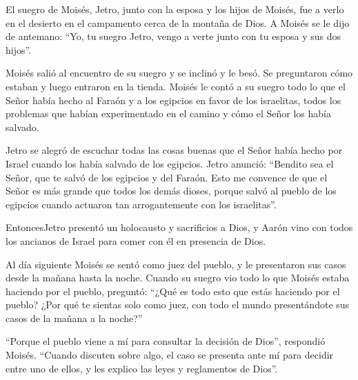  El suegro de Moisés, Jetro, junto con la esposa y los hijos
de Moisés, fue a verlo en el desierto en el campamento cerca de la
montaña de Dios.  A Moisés se le dijo de antemano: ``Yo, tu
suegro Jetro, vengo a verte junto con tu esposa y sus dos hijos''.

 Moisés salió al encuentro de su suegro y se inclinó y le
besó. Se preguntaron cómo estaban y luego entraron en la tienda.
 Moisés le contó a su suegro todo lo que el Señor había
hecho al Faraón y a los egipcios en favor de los israelitas, todos los
problemas que habían experimentado en el camino y cómo el Señor los
había salvado.

 Jetro se alegró de escuchar todas las cosas buenas que el
Señor había hecho por Israel cuando los había salvado de los egipcios.
 Jetro anunció: ``Bendito sea el Señor, que te salvó de los
egipcios y del Faraón.  Esto me convence de que el Señor es
más grande que todos los demás dioses, porque salvó al pueblo de los
egipcios cuando actuaron tan arrogantemente con los israelitas''.

 EntoncesJetro presentó un holocausto y sacrificios a Dios,
y Aarón vino con todos los ancianos de Israel para comer con él en
presencia de Dios.

 Al día siguiente Moisés se sentó como juez del pueblo, y
le presentaron sus casos desde la mañana hasta la noche. 
Cuando su suegro vio todo lo que Moisés estaba haciendo por el pueblo,
preguntó: ``¿Qué es todo esto que estás haciendo por el pueblo? ¿Por qué
te sientas solo como juez, con todo el mundo presentándote sus casos de
la mañana a la noche?''

 ``Porque el pueblo viene a mí para consultar la decisión
de Dios'', respondió Moisés.  ``Cuando discuten sobre algo,
el caso se presenta ante mí para decidir entre uno de ellos, y les
explico las leyes y reglamentos de Dios''.

